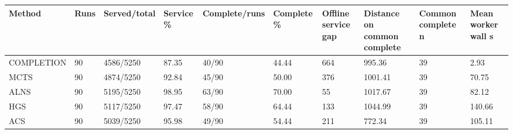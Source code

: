 \begin{tabular}{llllllllll}
\hline
Method & Runs & Served/total & Service \% & Complete/runs & Complete \% & Offline service gap & Distance on common complete & Common complete n & Mean worker wall s \\
\hline
COMPLETION & 90 & 4586/5250 & 87.35 & 40/90 & 44.44 & 664 & 995.36 & 39 & 2.93 \\
MCTS & 90 & 4874/5250 & 92.84 & 45/90 & 50.00 & 376 & 1001.41 & 39 & 70.75 \\
ALNS & 90 & 5195/5250 & 98.95 & 63/90 & 70.00 & 55 & 1017.67 & 39 & 82.12 \\
HGS & 90 & 5117/5250 & 97.47 & 58/90 & 64.44 & 133 & 1044.99 & 39 & 140.66 \\
ACS & 90 & 5039/5250 & 95.98 & 49/90 & 54.44 & 211 & 772.34 & 39 & 105.11 \\
\hline
\end{tabular}
